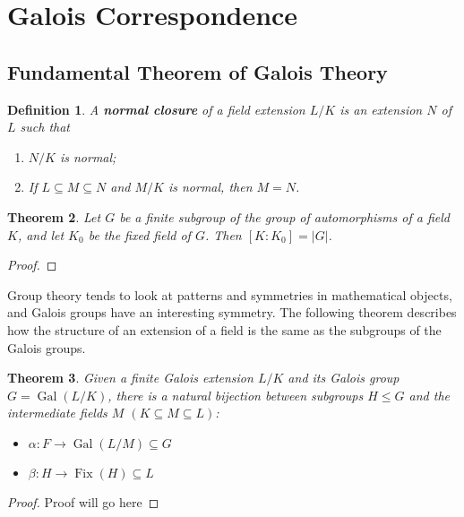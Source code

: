 \documentclass[12pt]{article}
\newtheorem{theorem}{Theorem}
\newtheorem{definition}[theorem]{Definition}
\newcommand{\Gal}{\operatorname{Gal}}
\newcommand{\Fix}{\operatorname{Fix}}
\begin{document}
\section{Galois Correspondence}
\subsection{Fundamental Theorem of Galois Theory}

\begin{definition}
    A \textbf{normal closure} of a field extension $L / K$ is an extension $N$
    of $L$ such that
    \begin{enumerate}
        \item $N / K$ is normal;
        \item If $L \subseteq M \subseteq N$ and $M / K$ is normal, then $M =
                  N$.
    \end{enumerate}
\end{definition}

\begin{theorem}
    Let $G$ be a finite subgroup of the group of automorphisms of a field $K$,
    and let $K_0$ be the fixed field of $G$. Then $[K : K_0] = |G|$.
\end{theorem}

\begin{proof}

\end{proof}

Group theory tends to look at patterns and symmetries in mathematical objects,
and Galois groups have an interesting symmetry. The following theorem describes
how the structure of an extension of a field is the same as the subgroups of
the Galois groups.

\begin{theorem}
    Given a finite Galois extension $L/K$ and its Galois group $G = \Gal(L/K)$,
    there is a natural bijection between subgroups $H\leq G$ and the
    intermediate
    fields $M$ \hspace{0.1cm} $(K \subseteq M \subseteq L)$:

    \begin{itemize}
        \item $\alpha:F \to \Gal(L/M) \subseteq G$
        \item $\beta:H \to \Fix(H) \subseteq L$
    \end{itemize}
\end{theorem}
\begin{proof}
    Proof will go here
\end{proof}
\end{document}

